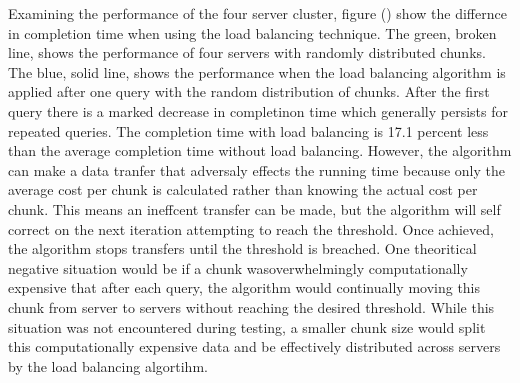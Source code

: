 \documentclass{article}
\newenvironment{Figure}
               {\par\medskip\noindent\minipage{\linewidth}}
               {\endminipage\par\medskip}
\begin{document}
\begin{multicols}{2}
\begin{Figure}
  \centering
  \noindent{}
\end{Figure}

Examining the performance of the four server cluster, figure () show the differnce in completion time when using the load balancing technique.  The green, broken line, shows the performance of four servers with randomly distributed chunks. The blue, solid line, shows the performance when the load balancing algorithm is applied after one query with the random distribution of chunks.  After the first query there is a marked decrease in completinon time which generally persists for repeated queries.  The completion time with load balancing is 17.1 percent less than the average completion time without load balancing.  However, the algorithm can make a data tranfer that adversaly effects the running time because only the average cost per chunk is calculated rather than knowing the actual cost per chunk. This means an ineffcent transfer can be made, but the algorithm will self correct on the next iteration attempting to reach the threshold. Once achieved, the algorithm stops transfers until the threshold is breached. One theoritical negative situation would be if a chunk wasoverwhelmingly computationally expensive that after each query, the algorithm would continually moving this chunk from server to servers without reaching the desired threshold.  While this situation was not encountered during testing, a smaller chunk size would split this computationally expensive data and be effectively distributed across servers by the load balancing algortihm. 


\end{multicols}
\end{document}
